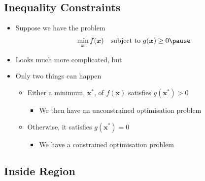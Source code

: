 \begin{slide}
\section{Inequality Constraints}

\begin{PauseHighLight}
  \begin{itemize}
  \item Suppose we have the problem
    \begin{align*}
      \min_{\bm{x}} f(\bm{x}) \quad \mbox{subject to $g(\bm{x})\geq 0$}\pause
    \end{align*}
  \item Looks much more complicated, but\pause
  \item Only two things can happen
    \begin{itemize}
    \item Either a minimum, $\bm{x}^*$, of $f(\bm{x})$ satisfies
    $g(\bm{x}^*)>0$ 
      \begin{itemize}
      \item We then have an unconstrained optimisation problem\pause
      \end{itemize}
    \item Otherwise, it satisfies  $g(\bm{x}^*)=0$
      \begin{itemize}
      \item We have a constrained optimisation problem\pause
      \end{itemize}
    \end{itemize}
  \end{itemize}
\end{PauseHighLight}

\end{slide}



\begin{slide}
\section[-2]{Inside Region}
\pb
\pause{}
\begin{center}
  \pause
\end{center}
\end{slide}


